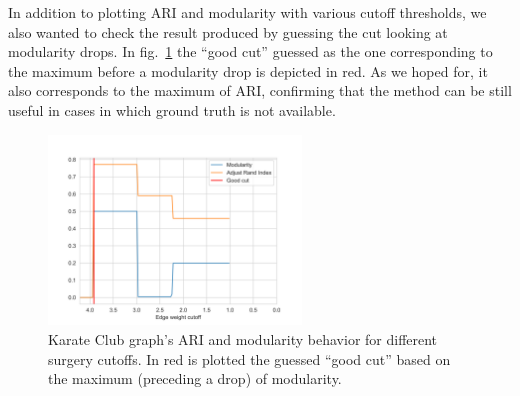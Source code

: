 In addition to plotting ARI and modularity with various cutoff thresholds, we also wanted to check the result produced by guessing the cut looking at modularity drops. In fig.~\ref{fig:Karate_Accuracy} the “good cut” guessed as the one corresponding to the maximum before a modularity drop is depicted in red. As we hoped for, it also corresponds to the maximum of ARI, confirming that the method can be still useful in cases in which ground truth is not available.
\begin{figure}
    \centering
    \includegraphics[width=0.6\textwidth]{../KarateClubResults/Surgery Accuracy.png}
    \caption{Karate Club graph's ARI and modularity behavior for different surgery cutoffs. In red is plotted the guessed “good cut” based on the maximum (preceding a drop) of modularity.}
    \label{fig:Karate_Accuracy}
\end{figure}

